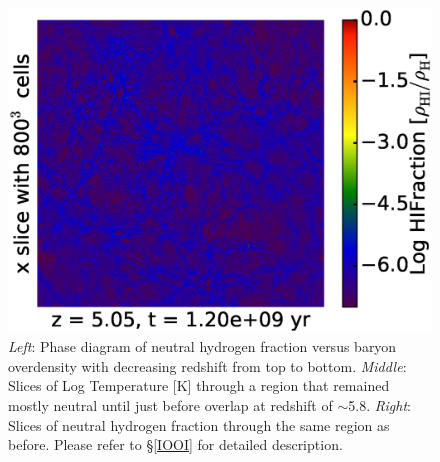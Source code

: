 \begin{figure}[!tp]
\begin{minipage}[h]{0.33\linewidth}
	\includegraphics[trim = 10mm 0mm 7mm 7mm, clip, width=1.0\textwidth]{5_3_slice_HIFraction_x_HD24175.eps}
	\end{minipage}

	\caption{{\em Left}: Phase diagram of neutral hydrogen fraction versus baryon overdensity with decreasing redshift from top to bottom.  {\em Middle}: Slices of Log Temperature [K] through a region that remained mostly neutral until just before overlap at redshift of $\sim$5.8. {\em Right}: Slices of neutral hydrogen fraction through the same region as before.  Please refer to \S\ref{IOOI} for detailed description.}
  \label{NeutralPhase}
\end{figure}


